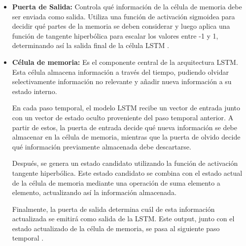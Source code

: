 \begin{itemize}
    \item \textbf{Puerta de Salida:} Controla qué información de la célula de memoria debe ser enviada como salida. Utiliza una función de activación sigmoidea para decidir qué partes de la memoria se deben considerar y luego aplica una función de tangente hiperbólica para escalar los valores entre -1 y 1, determinando así la salida final de la célula LSTM \cite{redes-lstm-long-short-term-memory}.
\end{itemize}

\begin{itemize}
    \item \textbf{Célula de memoria:} Es el componente central de la arquitectura LSTM. Esta célula almacena información a través del tiempo, pudiendo olvidar selectivamente información no relevante y añadir nueva información a su estado interno.

    En cada paso temporal, el modelo LSTM recibe un vector de entrada junto con un vector de estado oculto proveniente del paso temporal anterior. A partir de estos, la puerta de entrada decide qué nueva información se debe almacenar en la célula de memoria, mientras que la puerta de olvido decide qué información previamente almacenada debe descartarse.
    
    Después, se genera un estado candidato utilizando la función de activación tangente hiperbólica. Este estado candidato se combina con el estado actual de la célula de memoria mediante una operación de suma elemento a elemento, actualizando así la información almacenada.
    
    Finalmente, la puerta de salida determina cuál de esta información actualizada se emitirá como salida de la LSTM. Este output, junto con el estado actualizado de la célula de memoria, se pasa al siguiente paso temporal \cite{redes-lstm-long-short-term-memory}.
    
\end{itemize}

